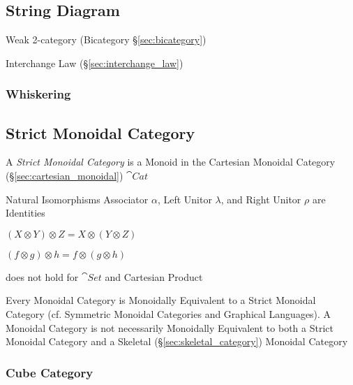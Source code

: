 \subsection{String Diagram}\label{sec:string_diagram}

Weak 2-category (Bicategory \S\ref{sec:bicategory})

Interchange Law (\S\ref{sec:interchange_law})



\subsubsection{Whiskering}\label{sec:whiskering}



\subsection{Strict Monoidal Category}\label{sec:strict_monoidal}

A \emph{Strict Monoidal Category} is a Monoid in the Cartesian
Monoidal Category (\S\ref{sec:cartesian_monoidal}) $\cat{Cat}$

Natural Isomorphisms Associator $\alpha$, Left Unitor $\lambda$, and
Right Unitor $\rho$ are Identities

$(X \otimes Y) \otimes Z = X \otimes (Y \otimes Z)$

$(f \otimes g) \otimes h = f \otimes (g \otimes h)$

does not hold for $\cat{Set}$ and Cartesian Product

Every Monoidal Category is Monoidally Equivalent to a Strict Monoidal
Category (cf. Symmetric Monoidal Categories and Graphical Languages).
A Monoidal Category is not necessarily Monoidally Equivalent to both a
Strict Monoidal Category and a Skeletal
(\S\ref{sec:skeletal_category}) Monoidal Category



\subsubsection{Cube Category}\label{sec:cube_category}

